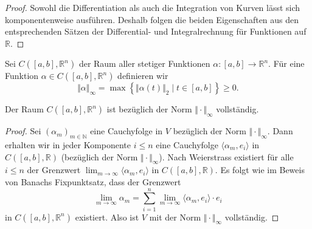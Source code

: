\documentclass[../main.tex]{subfiles}
\begin{document}
\begin{proof}
  Sowohl die Differentiation als auch die Integration von Kurven
  lässt sich komponentenweise ausführen.
  Deshalb folgen die beiden Eigenschaften aus den entsprechenden
  Sätzen der Differential- und Integralrechnung für Funktionen
  auf $\mathbb{R}$.
\end{proof}

Sei $C([a, b], \mathbb{R}^n)$ der Raum aller stetiger
Funktionen $\alpha \colon [a, b] \to \mathbb{R}^n$.
Für eine Funktion $\alpha \in C([a, b], \mathbb{R}^n)$ definieren wir
\[
  \Vert \alpha \Vert_{\infty}
  = \max \left\{\Vert \alpha(t) \Vert_2 \mid 
  t \in [a, b]\right\} \geq 0.
\]

\begin{lemma}
  Der Raum $C([a, b], \mathbb{R}^n)$ ist bezüglich der Norm
  $\Vert \cdot \Vert_{\infty}$ vollständig.
\end{lemma}

\begin{proof}
  Sei ${(\alpha_{m})}_{m \in \mathbb{N}}$ 
  eine Cauchyfolge in $V$ bezüglich der Norm %
  $\Vert \cdot \Vert_{\infty}$.
  Dann erhalten wir in jeder Komponente $i \leq n$ 
  eine Cauchyfolge $\langle \alpha_m, e_i \rangle$ 
  in $C([a, b], \mathbb{R})$ (bezüglich der Norm
  $\Vert \cdot \Vert_{\infty}$).
  Nach Weierstrass existiert für alle $i \leq n$ 
  der Grenzwert
  $\lim_{m \to \infty} \langle \alpha_m, e_i \rangle$ 
  in $C([a, b], \mathbb{R})$.
  Es folgt
  wie im Beweis von Banachs Fixpunktsatz, dass der Grenzwert
  \[
    \lim_{m \to \infty} \alpha_m
    = \sum_{i=1}^{n} \lim_{m \to \infty}
    \langle \alpha_m, e_i \rangle \cdot e_i 
  \]
  in $C([a, b], \mathbb{R}^n)$ existiert.
  Also ist $V$ mit der Norm $\Vert \cdot \Vert_\infty$ vollständig.
\end{proof}
\end{document}
